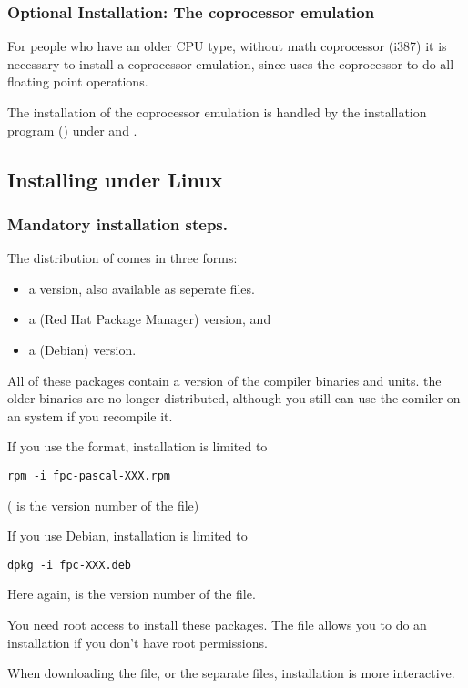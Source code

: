 \subsubsection{Optional Installation: The coprocessor emulation}
For people who have an older CPU type, without math coprocessor (i387)
it is necessary to install a coprocessor emulation, since \fpc uses the
coprocessor to do all floating point operations.

The installation of the coprocessor emulation is handled by the
installation program () under \dos and \windows.

%
%
\subsection{Installing under Linux}
\subsubsection{Mandatory installation steps.}
The \linux distribution of \fpc comes in three forms:
\begin{itemize}
\item a  version, also available as seperate files.
\item a  (Red Hat Package Manager) version, and
\item a  (Debian) version.
\end{itemize}
All of these packages contain a  version of the compiler binaries and
units. the older  binaries are no longer distributed, although you
still can use the comiler on an  system if you recompile it.

If you use the  format, installation is limited to
\begin{verbatim}
rpm -i fpc-pascal-XXX.rpm
\end{verbatim}
( is the version number of the  file)

If you use Debian, installation is limited to
\begin{verbatim}
dpkg -i fpc-XXX.deb
\end{verbatim}
Here again,  is the version number of the  file.

You need root access to install these packages. The  file
allows you to do an installation if you don't have root permissions.

When downloading the  file, or the separate files,
installation is more interactive.

